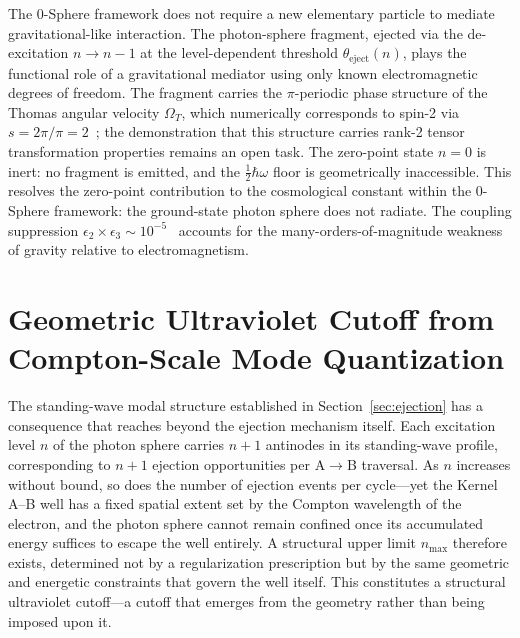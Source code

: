 \documentclass[%
 reprint, amsmath,amssymb, aps, prb, ]{revtex4-2}
\numberwithin{equation}{section}
\newcommand{\iphase}{\theta}
\begin{document}
\begin{table}[t!]
\begin{minipage}{0.95\textwidth}
\justifying\normalsize
The 0-Sphere framework does not require a new elementary particle to mediate gravitational-like interaction. The photon-sphere fragment, ejected via the de-excitation $n \to n-1$ at the level-dependent threshold $\iphase_{\text{eject}}(n)$, plays the functional role of a gravitational mediator using only known electromagnetic degrees of freedom. The fragment carries the $\pi$-periodic phase structure of the Thomas angular velocity $\Omega_T$, which numerically corresponds to spin-2 via $s = 2\pi/\pi = 2$~\cite{hanamura48}; the demonstration that this structure carries rank-2 tensor transformation properties remains an open task. The zero-point state $n=0$ is inert: no fragment is emitted, and the $\tfrac{1}{2}\hbar\omega$ floor is geometrically inaccessible. This resolves the zero-point contribution to the cosmological constant within the 0-Sphere framework: the ground-state photon sphere does not radiate. The coupling suppression $\epsilon_2 \times \epsilon_3 \sim 10^{-5}$~\cite{hanamura34} accounts for the many-orders-of-magnitude weakness of gravity relative to electromagnetism.
\end{minipage}
\end{table}

\section{Geometric Ultraviolet Cutoff from Compton-Scale Mode Quantization}
\label{sec:cutoff}

The standing-wave modal structure established in Section~\ref{sec:ejection} has a consequence that reaches beyond the ejection mechanism itself. Each excitation level $n$ of the photon sphere carries $n+1$ antinodes in its standing-wave profile, corresponding to $n+1$ ejection opportunities per A$\to$B traversal. As $n$ increases without bound, so does the number of ejection events per cycle---yet the Kernel A--B well has a fixed spatial extent set by the Compton wavelength of the electron, and the photon sphere cannot remain confined once its accumulated energy suffices to escape the well entirely. A structural upper limit $n_{\max}$ therefore exists, determined not by a regularization prescription but by the same geometric and energetic constraints that govern the well itself. This constitutes a structural ultraviolet cutoff---a cutoff that emerges from the geometry rather than being imposed upon it.
\end{document}
